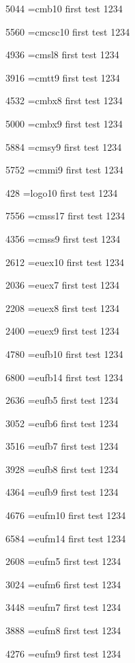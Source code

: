 5044	\tstfont \font\tstfont=cmb10 first test 1234 

5560	\tstfont \font\tstfont=cmcsc10 first test 1234 

4936	\tstfont \font\tstfont=cmsl8 first test 1234 

3916	\tstfont \font\tstfont=cmtt9 first test 1234 

4532	\tstfont \font\tstfont=cmbx8 first test 1234 

5000	\tstfont \font\tstfont=cmbx9 first test 1234 

5884	\tstfont \font\tstfont=cmsy9 first test 1234 

5752	\tstfont \font\tstfont=cmmi9 first test 1234 

428	\tstfont \font\tstfont=logo10 first test 1234 

7556	\tstfont \font\tstfont=cmss17 first test 1234 

4356	\tstfont \font\tstfont=cmss9 first test 1234 

2612	\tstfont \font\tstfont=euex10 first test 1234 

2036	\tstfont \font\tstfont=euex7 first test 1234 

2208	\tstfont \font\tstfont=euex8 first test 1234 

2400	\tstfont \font\tstfont=euex9 first test 1234 

4780	\tstfont \font\tstfont=eufb10 first test 1234 

6800	\tstfont \font\tstfont=eufb14 first test 1234 

2636	\tstfont \font\tstfont=eufb5 first test 1234 

3052	\tstfont \font\tstfont=eufb6 first test 1234 

3516	\tstfont \font\tstfont=eufb7 first test 1234 

3928	\tstfont \font\tstfont=eufb8 first test 1234 

4364	\tstfont \font\tstfont=eufb9 first test 1234 

4676	\tstfont \font\tstfont=eufm10 first test 1234 

6584	\tstfont \font\tstfont=eufm14 first test 1234 

2608	\tstfont \font\tstfont=eufm5 first test 1234 

3024	\tstfont \font\tstfont=eufm6 first test 1234 

3448	\tstfont \font\tstfont=eufm7 first test 1234 

3888	\tstfont \font\tstfont=eufm8 first test 1234 

4276	\tstfont \font\tstfont=eufm9 first test 1234 


